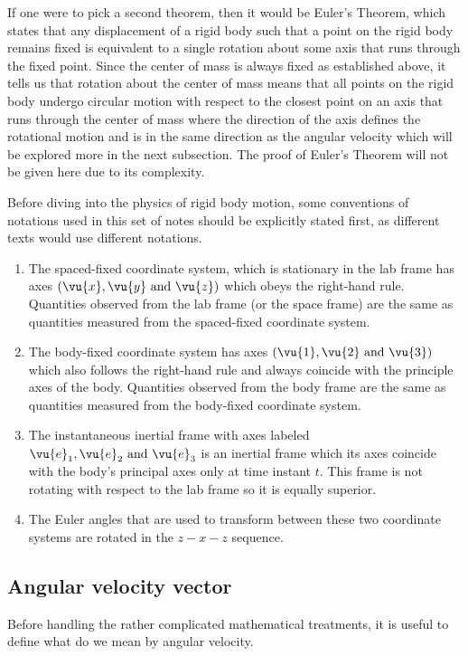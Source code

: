 \documentclass[a4paper,12pt]{report}
\begin{document}
If one were to pick a second theorem, then it would be Euler's Theorem, which states that any displacement of a rigid body such that a point on the rigid body remains fixed is equivalent to a single rotation about some axis that runs through the fixed point. Since the center of mass is always fixed as established above, it tells us that rotation about the center of mass means that all points on the rigid body undergo circular motion with respect to the closest point on an axis that runs through the center of mass where the direction of the axis defines the rotational motion and is in the same direction as the angular velocity which will be explored more in the next subsection. The proof of Euler's Theorem will not be given here due to its complexity.

Before diving into the physics of rigid body motion, some conventions of notations used in this set of notes should be explicitly stated first, as different texts would use different notations. 

\begin{enumerate}
	\item The spaced-fixed coordinate system, which is stationary in the lab frame has axes \((\vu{x}, \vu{y} \text{ and } \vu{z} )\) which obeys the right-hand rule. Quantities observed from the lab frame (or the space frame) are the same as quantities measured from the spaced-fixed coordinate system.

	\item The body-fixed coordinate system has axes \((\vu{1 }, \vu{2 } \text{ and } \vu{3 })\) which also follows the right-hand rule and always coincide with the principle axes of the body. Quantities observed from the body frame are the same as quantities measured from the body-fixed coordinate system.

	\item The instantaneous inertial frame with axes labeled \(\vu{e} _{1},\vu{e} _{2} \text{ and } \vu{e} _{3} \) is an inertial frame which its axes coincide with the body's principal axes only at time instant \(t\). This frame is not rotating with respect to the lab frame so it is equally superior. 
	
	\item The Euler angles that are used to transform between these two coordinate systems are rotated in the \(z-x-z\) sequence. 
\end{enumerate}

\subsection{Angular velocity vector}
Before handling the rather complicated mathematical treatments, it is useful to define what do we mean by angular velocity. 
\end{document}
